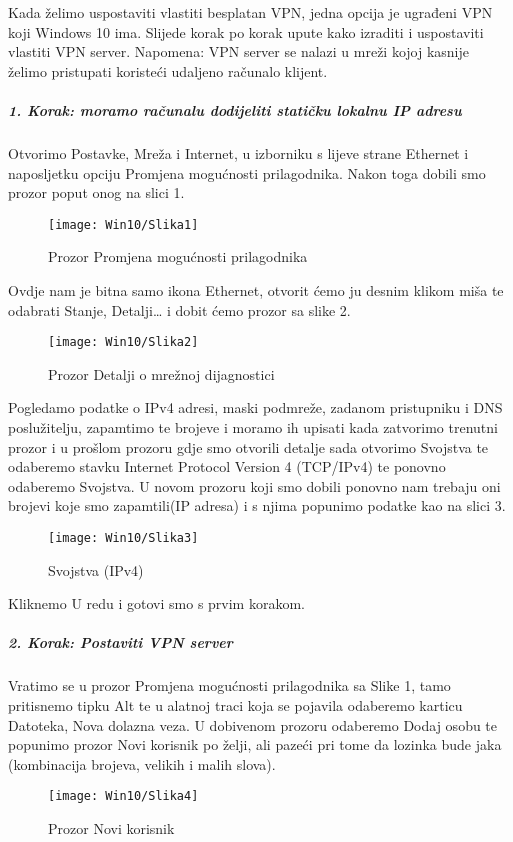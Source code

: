 \hfill \smallbreak
Kada želimo uspostaviti vlastiti besplatan VPN, jedna opcija je ugrađeni VPN koji Windows 10 ima. Slijede korak po korak upute kako izraditi i uspostaviti vlastiti VPN server. Napomena: VPN server se nalazi u mreži kojoj kasnije želimo pristupati koristeći udaljeno računalo klijent.  
\smallbreak
\subparagraph{1. Korak:  moramo računalu dodijeliti statičku lokalnu IP adresu}
\hfill \smallbreak
Otvorimo Postavke, Mreža i Internet, u izborniku s lijeve strane Ethernet i naposljetku opciju Promjena mogućnosti prilagodnika. Nakon toga dobili smo prozor poput onog na slici 1.
\begin{figure}[h!]
	\centering
     \texttt{[image: Win10/Slika1]}
     \caption{Prozor Promjena mogućnosti prilagodnika}
\end{figure}
\FloatBarrier
Ovdje nam je bitna samo ikona Ethernet, otvorit ćemo ju desnim klikom miša te odabrati Stanje, Detalji… i dobit ćemo prozor sa slike 2.
\begin{figure}[h!]
	\centering
     \texttt{[image: Win10/Slika2]}
     \caption{Prozor Detalji o mrežnoj dijagnostici}
\end{figure}
\FloatBarrier
Pogledamo podatke o IPv4 adresi, maski podmreže, zadanom pristupniku i DNS poslužitelju, zapamtimo te brojeve i moramo ih upisati kada zatvorimo trenutni prozor i u prošlom prozoru gdje smo otvorili detalje sada otvorimo Svojstva te odaberemo stavku Internet Protocol Version 4 (TCP/IPv4) te ponovno odaberemo Svojstva. U novom prozoru koji smo dobili ponovno nam trebaju oni brojevi koje smo zapamtili(IP adresa) i s njima popunimo podatke kao na slici 3.
\begin{figure}[h!]
	\centering
     \texttt{[image: Win10/Slika3]}
     \caption{Svojstva (IPv4)}
\end{figure}
\FloatBarrier
Kliknemo U redu i gotovi smo s prvim korakom.
\FloatBarrier
\newpage
\subparagraph{2. Korak: Postaviti VPN server}
\hfill \smallbreak
Vratimo se u prozor Promjena mogućnosti prilagodnika sa Slike 1, tamo pritisnemo tipku Alt te u alatnoj traci koja se pojavila odaberemo karticu Datoteka, Nova dolazna veza.
U dobivenom prozoru odaberemo Dodaj osobu te popunimo prozor Novi korisnik po želji, ali pazeći pri tome da lozinka bude jaka (kombinacija brojeva, velikih i malih slova).
\FloatBarrier
\begin{figure}[h!]
	\centering
     \texttt{[image: Win10/Slika4]}
     \caption{Prozor Novi korisnik}
\end{figure}
